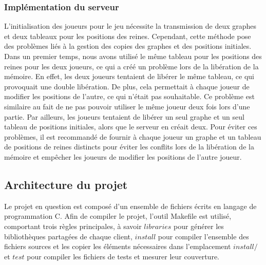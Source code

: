 \documentclass[11pt]{article}
\begin{document}
            \subsubsection{Implémentation du serveur}
           L'initialisation des joueurs pour le jeu nécessite la transmission de deux graphes et deux tableaux pour les positions des reines. Cependant, cette méthode pose des problèmes liés à la gestion des copies des graphes et des positions initiales. Dans un premier temps, nous avons utilisé le même tableau pour les positions des reines pour les deux joueurs, ce qui a créé un problème lors de la libération de la mémoire. En effet, les deux joueurs tentaient de libérer le même tableau, ce qui provoquait une double libération. De plus, cela permettait à chaque joueur de modifier les positions de l'autre, ce qui n'était pas souhaitable. Ce problème est similaire au fait de ne pas pouvoir utiliser le même joueur deux fois lors d'une partie. Par ailleurs, les joueurs tentaient de libérer un seul graphe et un seul tableau de positions initiales, alors que le serveur en créait deux. Pour éviter ces problèmes, il est recommandé de fournir à chaque joueur un graphe et un tableau de positions de reines distincts pour éviter les conflits lors de la libération de la mémoire et empêcher les joueurs de modifier les positions de l'autre joueur.


        
        \subsection{Architecture du projet}
            Le projet en question est composé d'un ensemble de fichiers écrits en langage de programmation C. Afin de compiler le projet, l'outil Makefile est utilisé, comportant trois règles principales, à savoir $libraries$ pour  générer les bibliothèques partagées de chaque client, $install$ pour compiler l'ensemble des fichiers sources et les copier les éléments nécessaires dans l'emplacement $install/$ et $test$ pour compiler les fichiers de tests et mesurer leur couverture. 
            
\end{document}

